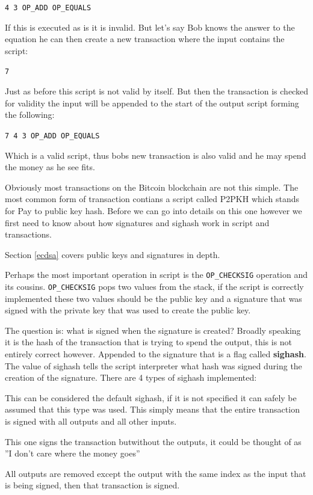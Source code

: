 \texttt{4 3 OP\_ADD OP\_EQUALS}

If this is executed as is it is invalid. But let's say Bob knows the answer to the equation he can then create a new transaction where the input contains the script: 

\texttt{7} 

Just as before this script is not valid by itself. But then the transaction is checked for validity the input will be appended to the start of the output script forming the following: 

\texttt{7 4 3 OP\_ADD OP\_EQUALS}

Which is a valid script, thus bobs new transaction is also valid and he may spend the money as he see fits. 

Obviously most transactions on the Bitcoin blockchain are not this simple. The most common form of transaction contians a script called P2PKH which stands for Pay to public key hash. Before we can go into details on this one however we first need to know about how signatures and sighash work in script and transactions.

Section \ref{ecdsa} covers public keys and signatures in depth.

Perhaps the most important operation in script is the \texttt{OP\_CHECKSIG} operation and its cousins. \texttt{OP\_CHECKSIG} pops two values from the stack, if the script is correctly implemented these two values should be the public key and a signature that was signed with the private key that was used to create the public key. 

The question is: what is signed when the signature is created? Broadly speaking it is the hash of the transaction that is trying to spend the output, this is not entirely correct however. Appended to the signature that is a flag called \textbf{sighash}. The value of sighash tells the script interpreter what hash was signed during the creation of the signature. There are 4 types of sighash implemented:

This can be considered the default sighash, if it is not specified it can safely be assumed that this type was used. This simply means that the entire transaction is signed with all outputs and all other inputs.


This one signs the transaction butwithout the outputs, it could be thought of as ''I don't care where the money goes''

All outputs are removed except the output with the same index as the input that is being signed, then that transaction is signed.

